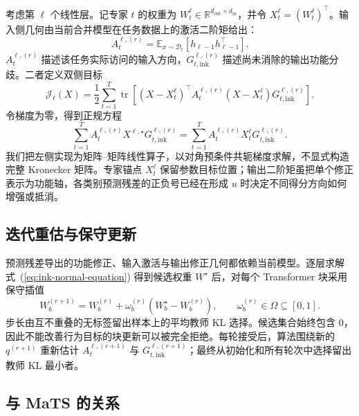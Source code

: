考虑第 $\ell$ 个线性层。记专家 $t$ 的权重为 $W_t^\ell\in\mathbb R^{d_{\mathrm{out}}\times d_{\mathrm{in}}}$，并令 $X_t^\ell=(W_t^\ell)^\top$。输入侧几何由当前合并模型在任务数据上的激活二阶矩给出：
\begin{equation}
  A_t^{\ell,(r)}
  =
  \mathbb E_{x\sim\mathcal D_t}
  \left[h_{\ell-1}h_{\ell-1}^\top\right].
  \label{eq:ink-input-geometry}
\end{equation}
$A_t^{\ell,(r)}$ 描述该任务实际访问的输入方向，$G_{t,\mathrm{ink}}^{\ell,(r)}$ 描述尚未消除的输出功能分歧。二者定义双侧目标
\begin{equation}
  \mathcal J_\ell(X)
  =
  \frac12\sum_{t=1}^T
  \operatorname{tr}
  \left[
    (X-X_t^\ell)^\top
    A_t^{\ell,(r)}
    (X-X_t^\ell)
    G_{t,\mathrm{ink}}^{\ell,(r)}
  \right].
  \label{eq:ink-layer-objective}
\end{equation}
令梯度为零，得到正规方程
\begin{equation}
  \boxed{
  \sum_{t=1}^T
  A_t^{\ell,(r)}X^{\ell,\star}G_{t,\mathrm{ink}}^{\ell,(r)}
  =
  \sum_{t=1}^T
  A_t^{\ell,(r)}X_t^\ell G_{t,\mathrm{ink}}^{\ell,(r)}
  }.
  \label{eq:ink-normal-equation}
\end{equation}
我们把左侧实现为矩阵--矩阵线性算子，以对角预条件共轭梯度求解，不显式构造完整 Kronecker 矩阵。专家锚点 $X_t^\ell$ 保留参数目标位置；输出二阶矩虽把单个修正表示为功能轴，各类别预测残差的正负号已经在形成 $u$ 时决定不同得分方向如何增强或抵消。

\subsection{迭代重估与保守更新}
\label{sec:ink-iterative-update}

预测残差导出的功能修正、输入激活与输出修正几何都依赖当前模型。逐层求解式~(\ref{eq:ink-normal-equation}) 得到候选权重 $W^\star$ 后，对每个 Transformer 块采用保守插值
\begin{equation}
  W_b^{(r+1)}
  =
  W_b^{(r)}
  +
  \omega_b^{(r)}
  \left(W_b^\star-W_b^{(r)}\right),
  \qquad
  \omega_b^{(r)}\in\Omega\subseteq[0,1].
  \label{eq:ink-conservative-step}
\end{equation}
步长由互不重叠的无标签留出样本上的平均教师 KL 选择。候选集合始终包含 $0$，因此不能改善行为目标的块更新可以被完全拒绝。每轮接受后，算法围绕新的 $q^{(r+1)}$ 重新估计 $A_t^{\ell,(r+1)}$ 与 $G_{t,\mathrm{ink}}^{\ell,(r+1)}$；最终从初始化和所有轮次中选择留出教师 KL 最小者。



\subsection{与 MaTS 的关系}
\label{sec:ink-mats-comparison}

